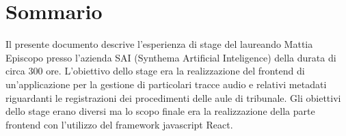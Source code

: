 
\cleardoublepage
{}
{}
\begingroup
\let\clearpage\relax
\let\cleardoublepage\relax
\let\cleardoublepage\relax

\chapter*{Sommario}

Il presente documento descrive l'esperienza di stage del laureando Mattia Episcopo presso l'azienda SAI (Synthema Artificial Inteligence) della durata di circa 300 ore.
L'obiettivo dello stage era la realizzazione del frontend di un'applicazione per la gestione di particolari tracce audio e relativi metadati riguardanti le registrazioni dei
procedimenti delle aule di tribunale. Gli obiettivi dello stage erano diversi ma lo scopo finale era la realizzazione della parte frontend con l'utilizzo del framework javascript React.

\endgroup

\vfill

